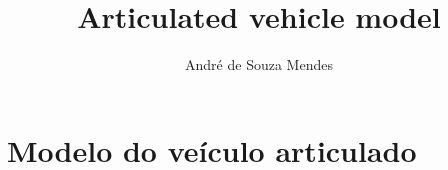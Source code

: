 \documentclass[sublist]{fei}
\author{André de Souza Mendes}
\title{Articulated vehicle model}
\begin{document}
\maketitle












\section{Modelo do veículo articulado}
\end{document}

